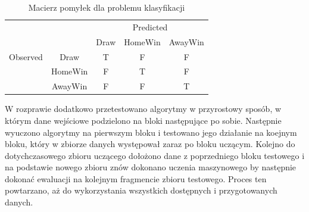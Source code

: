 \begin{center}
\begin{table}[H]
\renewcommand{\arraystretch}{1.5}
\caption{Macierz pomyłek dla problemu klasyfikacji}
\label{tab:macierz}
\begin{center}
\begin{tabular}{|c|c|c|c|c|}
   \cline{3-5} 
   \multicolumn{1}{c}{} & & \multicolumn{3}{c|}{Predicted} \\ \cline{3-5}
   \multicolumn{1}{c}{} & & Draw & HomeWin & AwayWin \\ \hline
   
   {Observed}
   & Draw & T & F & F \\ \cline{2-5}
   & HomeWin & F & T & F  \\ \cline{2-5}
   & AwayWin & F & F & T \\ \hline
\end{tabular}
\end{center}
\end{table}
\end{center}

W rozprawie dodatkowo przetestowano algorytmy w przyrostowy sposób, w którym dane wejściowe podzielono na bloki następujące po sobie. Następnie wyuczono algorytmy na pierwszym bloku i testowano jego działanie na koejnym bloku, który w zbiorze danych występował zaraz po bloku uczącym. Kolejno do dotychczasowego zbioru uczącego dołożono dane z poprzedniego bloku testowego i na podstawie nowego zbioru znów dokonano uczenia maszynowego by następnie dokonać ewaluacji na kolejnym fragmencie zbioru testowego. Proces ten powtarzano, aż do wykorzystania wszystkich dostępnych i przygotowanych danych.

